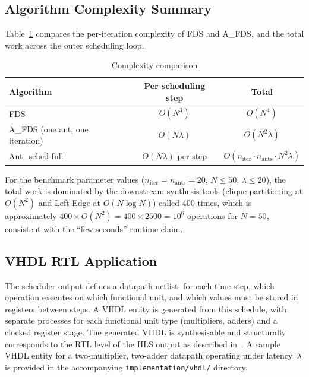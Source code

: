 \documentclass[conference]{IEEEtran}
\begin{document}
\subsection{Algorithm Complexity Summary}

Table~\ref{tab:complexity} compares the per-iteration complexity of FDS
and A\_FDS, and the total work across the outer scheduling loop.

\begin{table}[h]
  \centering
  \caption{Complexity comparison}
  \label{tab:complexity}
  \begin{tabular}{lcc}
    \toprule
    Algorithm & Per scheduling step & Total \\
    \midrule
    FDS & $O(N^{3})$ & $O(N^{4})$ \\
    A\_FDS (one ant, one iteration) & $O(N\lambda)$ & $O(N^{2}\lambda)$ \\
    Ant\_sched full & $O(N\lambda)$ per step &
      $O(n_{\text{iter}} \cdot n_{\text{ants}} \cdot N^{2}\lambda)$ \\
    \bottomrule
  \end{tabular}
\end{table}

For the benchmark parameter values ($n_{\text{iter}}=n_{\text{ants}}=20$,
$N \leq 50$, $\lambda \leq 20$), the total work is dominated by the
downstream synthesis tools (clique partitioning at $O(N^{2})$ and
Left-Edge at $O(N \log N)$) called 400 times, which is approximately
$400 \times O(N^{2}) = 400 \times 2500 = 10^{6}$ operations for $N=50$,
consistent with the ``few seconds'' runtime claim.

\subsection{VHDL RTL Application}

The scheduler output defines a datapath netlist: for each time-step,
which operation executes on which functional unit, and which values
must be stored in registers between steps. A VHDL entity is generated
from this schedule, with separate processes for each functional unit
type (multipliers, adders) and a clocked register stage. The generated
VHDL is synthesisable and structurally corresponds to the RTL level of
the HLS output as described in~\cite{kopuri2004aco}. A sample VHDL
entity for a two-multiplier, two-adder datapath operating under
latency~$\lambda$ is provided in the accompanying
\texttt{implementation/vhdl/} directory.

\end{document}
